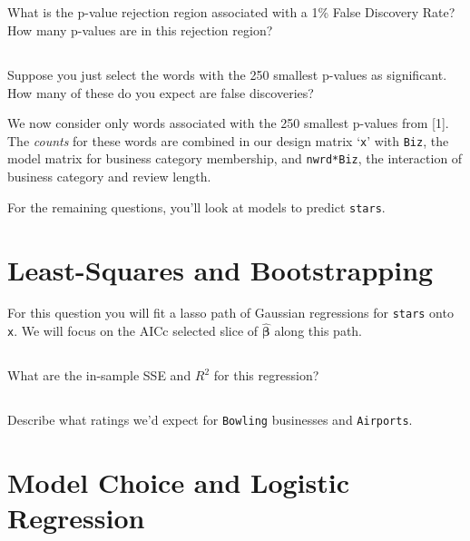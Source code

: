 \documentclass[12pt]{article}
\newcommand{\bs}[1]{\boldsymbol{#1}}
\begin{document}
\subsection{} What is the p-value rejection region associated with a 1\% False Discovery Rate?  \\How many p-values are in this rejection region?

\subsection{} Suppose you just select the words with the 250 smallest p-values as significant.\\ How many of these do you expect are false discoveries?

\vskip 1in

\bigskip
\noindent We now consider only words associated with the 250 smallest p-values from [1].  The {\it counts} for these words are combined in our design matrix `{\tt x}' with {\tt Biz}, the model matrix for business category membership, and {\tt nwrd*Biz}, the interaction of business category and review length.  

\medskip 
\noindent For the remaining questions, you'll look at models to predict {\tt stars}.

\newpage
\section{Least-Squares and Bootstrapping}

For this question you will fit a lasso path of Gaussian regressions for {\tt stars} onto {\tt x}.  We will focus on the AICc selected slice of $\bs{\hat\beta}$ along this path. 

\subsection{} 
What are the in-sample SSE and $R^2$ for this regression?

\subsection{}
Describe what ratings we'd expect for {\tt Bowling} businesses and {\tt Airports}.




\newpage
\section{Model Choice and Logistic Regression}
\end{document}

